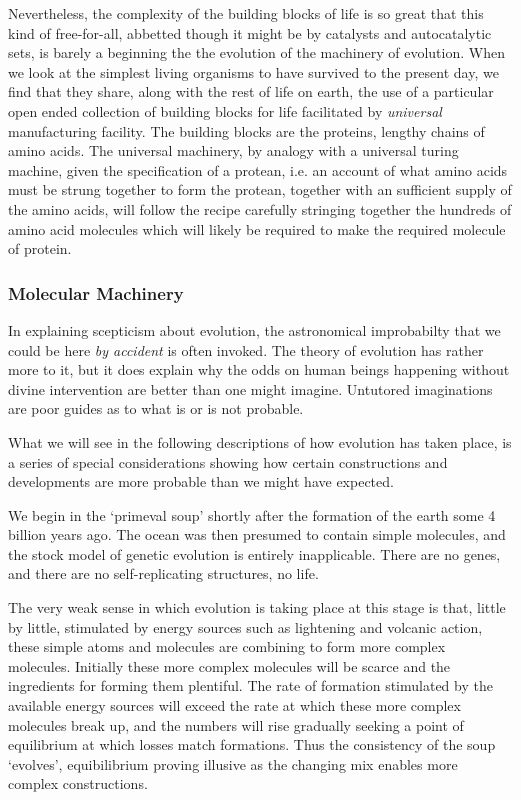 \documentclass[10pt,titlepage]{book}
\begin{document}
  Nevertheless, the complexity of the building blocks of life is so great that this kind of free-for-all, abbetted though it might be by catalysts and autocatalytic sets, is barely a beginning the the evolution of the machinery of evolution.
  When we look at the simplest living organisms to have survived to the present day, we find that they share, along with the rest of life on earth, the use of a particular open ended collection of building blocks for life facilitated by \emph{universal} manufacturing facility.
  The building blocks are the proteins, lengthy chains of amino acids.
  The universal machinery, by analogy with a universal turing machine, given the specification of a protean, i.e. an account of what amino acids must be strung together to form the protean, together with an sufficient supply of the amino acids, will follow the recipe carefully stringing together the hundreds of amino acid molecules which will likely be required to make the required molecule of protein.

  \subsubsection {Molecular Machinery}

    In explaining scepticism about evolution, the astronomical improbabilty that we could be here \emph{by accident} is often invoked.
    The theory of evolution has rather more to it, but it does explain why the odds on human beings happening without divine intervention are better than one might imagine.
    Untutored imaginations are poor guides as to what is or is not probable.
    
    What we will see in the following descriptions of how evolution has taken place, is a series of special considerations showing how certain constructions and developments are more probable than we might have expected.

    We begin in the `primeval soup' shortly after the formation of the earth some 4 billion years ago.
    The ocean was then presumed to contain simple molecules, and the stock model of genetic evolution is entirely inapplicable.
    There are no genes, and there are no self-replicating structures, no life.
    
    The very weak sense in which evolution is taking place at this stage is that, little by little, stimulated by energy sources such as lightening and volcanic action, these simple atoms and molecules are combining to form more complex molecules.
    Initially these more complex molecules will be scarce and the ingredients for forming them plentiful.
    The rate of formation stimulated by the available energy sources will exceed the rate at which these more complex molecules break up, and the numbers will rise gradually seeking a point of equilibrium at which losses match formations.
    Thus the consistency of the soup `evolves', equibilibrium proving illusive as the changing mix enables more complex constructions.
\end{document}
